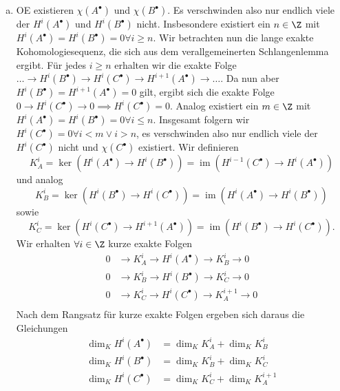 \documentclass{article}
\newcommand{\im}{\operatorname{im}}
\begin{document}
\begin{enumerate}[(a)]
    \item OE existieren $\chi(A^\bullet)$ und $\chi(B^\bullet)$.
          Es verschwinden also nur endlich viele der $H^i(A^\bullet)$ und $H^i(B^\bullet)$ nicht.
          Insbesondere existiert ein $n \in \Z$ mit $H^i(A^\bullet) = H^i(B^\bullet) = 0\forall i \geq n$.
          Wir betrachten nun die lange exakte Kohomologiesequenz, die sich aus dem verallgemeinerten Schlangenlemma ergibt.
          Für jedes $i \geq n$ erhalten wir die exakte Folge $\dots \to H^i(B^\bullet) \to H^i(C^\bullet) \to H^{i+1}(A^\bullet) \to \dots$.
          Da nun aber $H^i(B^\bullet) = H^{i+1}(A^\bullet) = 0$ gilt, ergibt sich die exakte Folge $0 \to H^i(C^\bullet) \to 0 \implies H^i(C^\bullet) = 0$.
          Analog existiert ein $m \in \Z$ mit $H^i(A^\bullet) = H^i(B^\bullet) = 0\forall i \leq n$.
          Insgesamt folgern wir $H^i(C^\bullet) = 0 \forall i < m \lor i > n$,
          es verschwinden also nur endlich viele der $H^i(C^\bullet)$ nicht und $\chi(C^\bullet)$ existiert.
          Wir definieren
          \[
              K_A^i = \ker(H^i(A^\bullet) \to H^i(B^\bullet)) = \im(H^{i-1}(C^\bullet) \to H^i(A^\bullet))
          \]
          und analog
          \[
              K_B^i = \ker(H^i(B^\bullet) \to H^i(C^\bullet)) = \im(H^i(A^\bullet) \to H^i(B^\bullet))
          \]
          sowie
          \[
              K_C^i = \ker(H^i(C^\bullet) \to H^{i+1}(A^\bullet)) = \im(H^i(B^\bullet) \to H^i(C^\bullet)).
          \]
          Wir erhalten $\forall i \in \Z$ kurze exakte Folgen
          \begin{align*}
              0 & \to K_A^i \to H^i(A^\bullet) \to K_B^i \to 0     \\
              0 & \to K_B^i \to H^i(B^\bullet) \to K_C^i \to 0     \\
              0 & \to K_C^i \to H^i(C^\bullet) \to K_A^{i+1} \to 0 \\
          \end{align*}
          Nach dem Rangsatz für kurze exakte Folgen ergeben sich daraus die Gleichungen
          \begin{align*}
              \dim_K H^i(A^\bullet) & = \dim_K K_A^i + \dim_K K_B^i     \\
              \dim_K H^i(B^\bullet) & = \dim_K K_B^i + \dim_K K_C^i     \\
              \dim_K H^i(C^\bullet) & = \dim_K K_C^i + \dim_K K_A^{i+1} \\
          \end{align*}

\end{enumerate}
\end{document}
